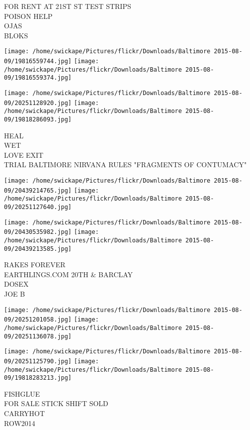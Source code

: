 \documentclass[10pt,letterpaper]{article}
\begin{document}
FOR RENT AT 21ST ST TEST STRIPS\\
POISON HELP\\
OJAS\\
BLOKS\\
\pagebreak

\texttt{[image: /home/swickape/Pictures/flickr/Downloads/Baltimore 2015-08-09/19816559744.jpg]}
\texttt{[image: /home/swickape/Pictures/flickr/Downloads/Baltimore 2015-08-09/19816559374.jpg]}

\texttt{[image: /home/swickape/Pictures/flickr/Downloads/Baltimore 2015-08-09/20251128920.jpg]}
\texttt{[image: /home/swickape/Pictures/flickr/Downloads/Baltimore 2015-08-09/19818286093.jpg]}

HEAL\\
WET\\
LOVE EXIT\\
TRIAL BALTIMORE NIRVANA RULES "FRAGMENTS OF CONTUMACY"\\
\pagebreak

\texttt{[image: /home/swickape/Pictures/flickr/Downloads/Baltimore 2015-08-09/20439214765.jpg]}
\texttt{[image: /home/swickape/Pictures/flickr/Downloads/Baltimore 2015-08-09/20251127640.jpg]}

\texttt{[image: /home/swickape/Pictures/flickr/Downloads/Baltimore 2015-08-09/20430535982.jpg]}
\texttt{[image: /home/swickape/Pictures/flickr/Downloads/Baltimore 2015-08-09/20439213585.jpg]}

RAKES FOREVER\\
EARTHLINGS.COM 20TH \& BARCLAY\\
DOSEX\\
JOE B\\
\pagebreak

\texttt{[image: /home/swickape/Pictures/flickr/Downloads/Baltimore 2015-08-09/20251201058.jpg]}
\texttt{[image: /home/swickape/Pictures/flickr/Downloads/Baltimore 2015-08-09/20251136078.jpg]}

\texttt{[image: /home/swickape/Pictures/flickr/Downloads/Baltimore 2015-08-09/20251125790.jpg]}
\texttt{[image: /home/swickape/Pictures/flickr/Downloads/Baltimore 2015-08-09/19818283213.jpg]}

FISHGLUE\\
FOR SALE STICK SHIFT SOLD\\
CARRYHOT\\
ROW2014\\
\pagebreak
\end{document}

